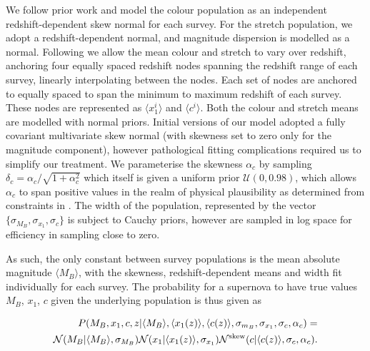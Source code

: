 \documentclass[a4paper,fleqn,usenatbib]{mnras}
\newcommand{\rubin}{\citetalias{Rubin2015}}
\begin{document}
We follow prior work and model the colour population as an independent redshift-dependent skew normal for each survey. For the stretch population, we adopt a redshift-dependent normal, and magnitude dispersion is modelled as a normal. Following {\rubin} we allow the mean colour and stretch to vary over redshift, anchoring four equally spaced redshift nodes spanning the redshift range of each survey, linearly interpolating between the nodes. Each set of nodes are anchored to equally spaced to span the minimum to maximum redshift of each survey. These nodes are represented as $\langle x_1^i \rangle$ and $\langle c^i \rangle$. Both the colour and stretch means are modelled with normal priors. Initial versions of our model adopted a fully covariant multivariate skew normal (with skewness set to zero only for the magnitude component), however pathological fitting complications required us to simplify our treatment. We parameterise the skewness $\alpha_c$ by sampling $\delta_c = \alpha_c / \sqrt{1 + \alpha_c^2}$ which itself is given a uniform prior $\mathcal{U}(0,0.98)$, which allows $\alpha_c$ to span positive values in the realm of physical plausibility as determined from constraints in \citet{Scolnic2016}. The width of the population, represented by the vector $\lbrace \sigma_{M_B}, \sigma_{x_1}, \sigma_c \rbrace$ is subject to Cauchy priors, however are sampled in log space for efficiency in sampling close to zero. 

As such, the only constant between survey populations is the mean absolute magnitude $\langle M_B \rangle$, with the skewness, redshift-dependent means and width fit individually for each survey. The probability for a supernova to have true values $M_B$, $x_1$, $c$ given the underlying population is thus given as

\begin{align}
P(M_B, x_1, c, z | \langle M_B \rangle, \langle x_1(z) \rangle, \langle c(z) \rangle, \sigma_{m_B}, \sigma_{x_1}, \sigma_c, \alpha_c) = \notag \\
\mathcal{N}(M_B|\langle M_B \rangle, \sigma_{M_B}) \mathcal{N}(x_1 | \langle x_1(z) \rangle, \sigma_{x_1}) \mathcal{N}^{\rm{skew}}(c| \langle c(z) \rangle, \sigma_c, \alpha_c) \label{eq:l1}.
\end{align}
\end{document}
